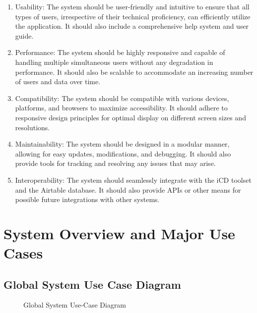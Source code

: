 \begin{enumerate}
    \item Usability: The system should be user-friendly and intuitive to ensure that all types of users, irrespective of their technical proficiency, can efficiently utilize the application. It should also include a comprehensive help system and user guide.
    \item Performance: The system should be highly responsive and capable of handling multiple simultaneous users without any degradation in performance. It should also be scalable to accommodate an increasing number of users and data over time.
    \item Compatibility: The system should be compatible with various devices, platforms, and browsers to maximize accessibility. It should adhere to responsive design principles for optimal display on different screen sizes and resolutions.
    \item Maintainability: The system should be designed in a modular manner, allowing for easy updates, modifications, and debugging. It should also provide tools for tracking and resolving any issues that may arise.   
    \item Interoperability: The system should seamlessly integrate with the iCD toolset and the Airtable database. It should also provide APIs or other means for possible future integrations with other systems.
\end{enumerate}    
    


\section{System Overview and Major Use Cases}

\subsection{Global System Use Case Diagram}
\begin{figure}[H]
    \centering
    \caption{ Global System Use-Case Diagram }
    \label{fig:Global_System_UseCase_Diagram}
\end{figure}

